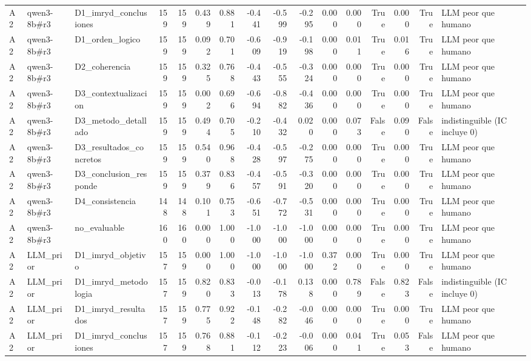 \begin{table}
{\begin{tabular}{lllrrrrrrrrrrrrl}
A2 & qwen3-8b\#r3 & D1\_imryd\_conclusiones & 159 & 159 & 0.439 & 0.881 & -0.441 & -0.599 & -0.295 & 0.000 & 0.000 & True & 0.000 & True & LLM peor que humano \\
A2 & qwen3-8b\#r3 & D1\_orden\_logico & 159 & 159 & 0.092 & 0.701 & -0.609 & -0.919 & -0.198 & 0.000 & 0.011 & True & 0.016 & True & LLM peor que humano \\
A2 & qwen3-8b\#r3 & D2\_coherencia & 159 & 159 & 0.325 & 0.768 & -0.443 & -0.555 & -0.324 & 0.000 & 0.000 & True & 0.000 & True & LLM peor que humano \\
A2 & qwen3-8b\#r3 & D3\_contextualizacion & 159 & 159 & 0.002 & 0.696 & -0.694 & -0.882 & -0.436 & 0.000 & 0.000 & True & 0.000 & True & LLM peor que humano \\
A2 & qwen3-8b\#r3 & D3\_metodo\_detallado & 159 & 159 & 0.494 & 0.705 & -0.210 & -0.432 & 0.020 & 0.000 & 0.073 & False & 0.090 & False & indistinguible (IC incluye 0) \\
A2 & qwen3-8b\#r3 & D3\_resultados\_concretos & 159 & 159 & 0.540 & 0.968 & -0.428 & -0.597 & -0.275 & 0.000 & 0.000 & True & 0.000 & True & LLM peor que humano \\
A2 & qwen3-8b\#r3 & D3\_conclusion\_responde & 159 & 159 & 0.379 & 0.836 & -0.457 & -0.591 & -0.320 & 0.000 & 0.000 & True & 0.000 & True & LLM peor que humano \\
A2 & qwen3-8b\#r3 & D4\_consistencia & 148 & 148 & 0.101 & 0.753 & -0.651 & -0.772 & -0.531 & 0.000 & 0.000 & True & 0.000 & True & LLM peor que humano \\
A2 & qwen3-8b\#r3 & no\_evaluable & 160 & 160 & 0.000 & 1.000 & -1.000 & -1.000 & -1.000 & 0.000 & 0.000 & True & 0.000 & True & LLM peor que humano \\
A2 & LLM\_prior & D1\_imryd\_objetivo & 157 & 159 & 0.000 & 1.000 & -1.000 & -1.000 & -1.000 & 0.372 & 0.000 & True & 0.000 & True & LLM peor que humano \\
A2 & LLM\_prior & D1\_imryd\_metodologia & 157 & 159 & 0.820 & 0.833 & -0.013 & -0.178 & 0.138 & 0.000 & 0.789 & False & 0.823 & False & indistinguible (IC incluye 0) \\
A2 & LLM\_prior & D1\_imryd\_resultados & 157 & 159 & 0.775 & 0.922 & -0.148 & -0.282 & -0.046 & 0.000 & 0.000 & True & 0.000 & True & LLM peor que humano \\
A2 & LLM\_prior & D1\_imryd\_conclusiones & 157 & 159 & 0.768 & 0.881 & -0.112 & -0.223 & -0.006 & 0.000 & 0.041 & True & 0.053 & False & LLM peor que humano \\

\end{tabular}}
\end{table}
